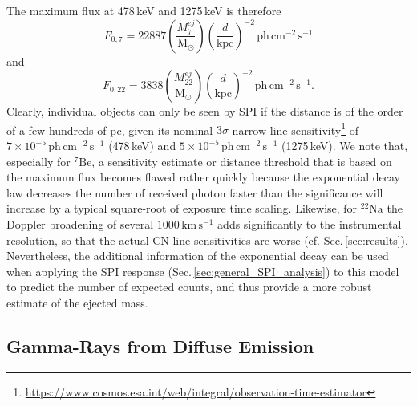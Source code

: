 \documentclass{aa}
\newcommand{\mrm}[1]{\mathrm{#1}}
\newcommand{\nuc}[2]{$\mrm{^{#2}#1}$}
\begin{document}
%
The maximum flux at 478\,keV and 1275\,keV is therefore
%
\begin{equation}
F_{0,7} = 22887 \left( \frac{M_7^{ej}}{\mrm{M_{\odot}}} \right) \left( \frac{d}{\mrm{kpc}} \right)^{-2}\,\mrm{ph\,cm^{-2}\,s^{-1}}
\label{eq:flux_ps_7}
\end{equation}
%
\noindent and
%
\begin{equation}
F_{0,22} = 3838 \left( \frac{M_{22}^{ej}}{\mrm{M_{\odot}}} \right) \left( \frac{d}{\mrm{kpc}} \right)^{-2}\,\mrm{ph\,cm^{-2}\,s^{-1}}\mrm{.}
\label{eq:flux_ps_22}
\end{equation}
%
Clearly, individual objects can only be seen by SPI if the distance is of the order of a few hundreds of pc, given its nominal $3\sigma$ narrow line sensitivity\footnote{\url{https://www.cosmos.esa.int/web/integral/observation-time-estimator}} of $7 \times 10^{-5}\,\mrm{ph\,cm^{-2}\,s^{-1}}$ (478\,keV) and $5 \times 10^{-5}\,\mrm{ph\,cm^{-2}\,s^{-1}}$ (1275\,keV).
%
We note that, especially for \nuc{Be}{7}, a sensitivity estimate or distance threshold that is based on the maximum flux becomes flawed rather quickly because the exponential decay law decreases the number of received photon faster than the significance will increase by a typical square-root of exposure time scaling.
%
Likewise, for \nuc{Na}{22} the Doppler broadening of several $1000\,\mrm{km\,s^{-1}}$ adds significantly to the instrumental resolution, so that the actual CN line sensitivities are worse (cf. Sec.\,\ref{sec:results}).
%
Nevertheless, the additional information of the exponential decay can be used when applying the SPI response (Sec.\,\ref{sec:general_SPI_analysis}) to this model to predict the number of expected counts, and thus provide a more robust estimate of the ejected mass.


\subsection{Gamma-Rays from Diffuse Emission}\label{sec:diffuse_emission}
\end{document}
